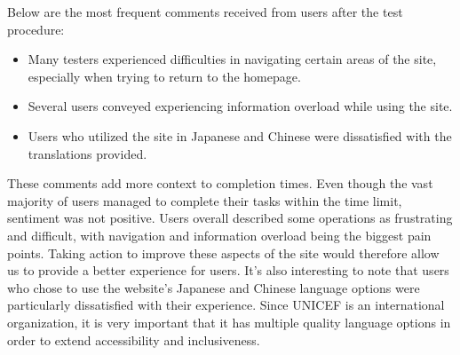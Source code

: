 Below are the most frequent comments received from users after the test procedure: 

\begin{itemize}
    \item Many testers experienced difficulties in navigating certain areas of the site, especially when trying to return to the homepage.
    \item Several users conveyed experiencing information overload while using the site.
    \item Users who utilized the site in Japanese and Chinese were dissatisfied with the translations provided.
\end{itemize}

These comments add more context to completion times.
Even though the vast majority of users managed to complete their tasks within the time limit, sentiment was not positive.
Users overall described some operations as frustrating and difficult, with navigation and information overload being the biggest pain points.
Taking action to improve these aspects of the site would therefore allow us to provide a better experience for users.
It's also interesting to note that users who chose to use the website's Japanese and Chinese language options were particularly dissatisfied with their experience.
Since UNICEF is an international organization, it is very important that it has multiple quality language options in order to extend accessibility and inclusiveness.
